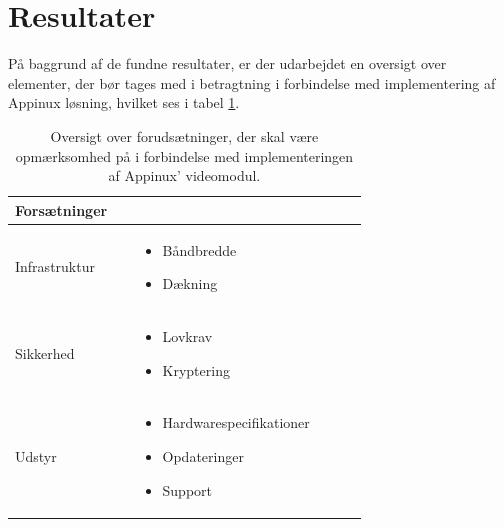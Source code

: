\section{Resultater}
På baggrund af de fundne resultater, er der udarbejdet en oversigt over elementer, der bør tages med i betragtning i forbindelse med implementering af Appinux løsning, hvilket ses i tabel \ref{tab:tabelforud}.
\begin{table}[H]
\caption{Oversigt over forudsætninger, der skal være opmærksomhed på i forbindelse med implementeringen af Appinux' videomodul.}
\centering
\label{tab:tabelforud}
\begin{tabular}{|p{0.2\linewidth}m{0.5\linewidth}|}
\hline
\cellcolor{blue!25} \textbf{Forsætninger} &\cellcolor{blue!25}\\ \hline
Infrastruktur & \begin{itemize}\item Båndbredde\item Dækning \end{itemize}\\ \hline
Sikkerhed & \begin{itemize}\item Lovkrav\item Kryptering \end{itemize}\\ \hline
Udstyr & \begin{itemize}\item Hardwarespecifikationer \item Opdateringer \item Support \end{itemize}\\ \hline
\end{tabular}

\end{table}
